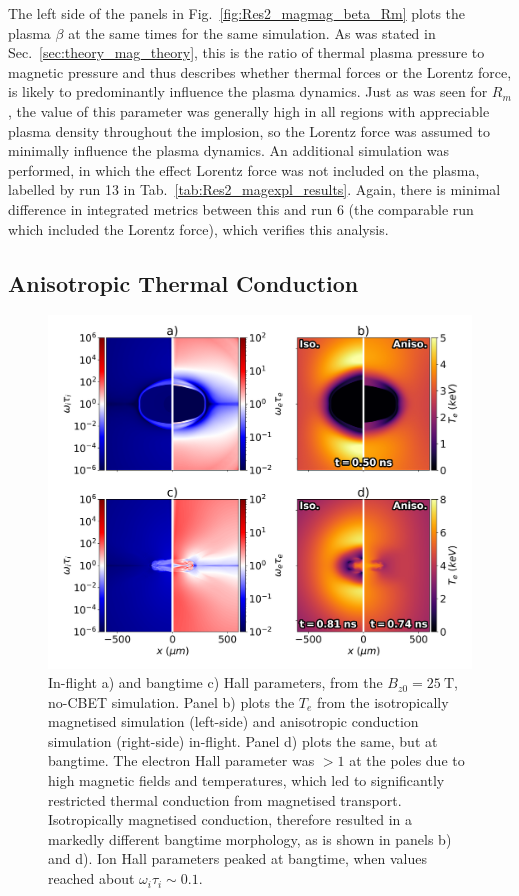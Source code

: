 The left side of the panels in Fig.~\ref{fig:Res2_magmag_beta_Rm} plots the plasma $\beta$ at the same times for the same simulation.
As was stated in Sec.~\ref{sec:theory_mag_theory}, this is the ratio of thermal plasma pressure to magnetic pressure and thus describes whether thermal forces or the Lorentz force, is likely to predominantly influence the plasma dynamics.
Just as was seen for $R_m$, the value of this parameter was generally high in all regions with appreciable plasma density throughout the implosion, so the Lorentz force was assumed to minimally influence the plasma dynamics.
An additional simulation was performed, in which the effect Lorentz force was not included on the plasma, labelled by run 13 in Tab.~\ref{tab:Res2_magexpl_results}.
Again, there is minimal difference in integrated metrics between this and run 6 (the comparable run which included the Lorentz force), which verifies this analysis.

\subsection{Anisotropic Thermal Conduction}%
\label{sec:Res2_aniso}

\begin{figure}[t!]
    \includegraphics[width=0.8\linewidth]{Results2/Images/iso_aniso.png}
    \centering
    \caption{In-flight a) and bangtime c) Hall parameters, from the $B_{z0}=25\ \text{T}$, no-\ac{CBET} simulation.
    Panel b) plots the $T_e$ from the isotropically magnetised simulation (left-side) and anisotropic conduction simulation (right-side) in-flight.
    Panel d) plots the same, but at bangtime.
    The electron Hall parameter was $>1$ at the poles due to high magnetic fields and temperatures, which led to significantly restricted thermal conduction from magnetised transport.
    Isotropically magnetised conduction, therefore resulted in a markedly different bangtime morphology, as is shown in panels b) and d).
    Ion Hall parameters peaked at bangtime, when values reached about $\omega_i\tau_i\sim0.1$.}%
    \label{fig:Res2_iso_aniso}
\end{figure}

